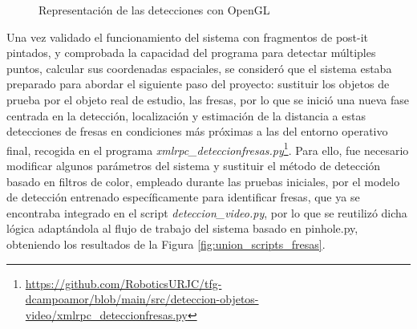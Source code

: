     \begin{figure}[H]
      \begin{center}
        \subcapcentertrue
        \hspace{1mm}
      \end{center}
      \caption{Representación de las detecciones con OpenGL}
      \label{fig:dist_camara}
    \end{figure}

Una vez validado el funcionamiento del sistema con fragmentos de post-it pintados, y comprobada la capacidad del programa para detectar múltiples puntos, calcular sus coordenadas espaciales, se consideró que el sistema estaba preparado para abordar el siguiente paso del proyecto: sustituir los objetos de prueba por el objeto real de estudio, las fresas, por lo que se inició una nueva fase centrada en la detección, localización y estimación de la distancia a estas detecciones de fresas en condiciones más próximas a las del entorno operativo final, recogida en el programa \textit{xmlrpc\_deteccionfresas.py}\footnote{\url{https://github.com/RoboticsURJC/tfg-dcampoamor/blob/main/src/deteccion-objetos-video/xmlrpc_deteccionfresas.py}}. Para ello, fue necesario modificar algunos parámetros del sistema y sustituir el método de detección basado en filtros de color, empleado durante las pruebas iniciales, por el modelo de detección entrenado específicamente para identificar fresas, que ya se encontraba integrado en el script \textit{deteccion\_video.py}, por lo que se reutilizó dicha lógica adaptándola al flujo de trabajo del sistema basado en pinhole.py, obteniendo los resultados de la Figura \ref{fig:union_scripts_fresas}.

